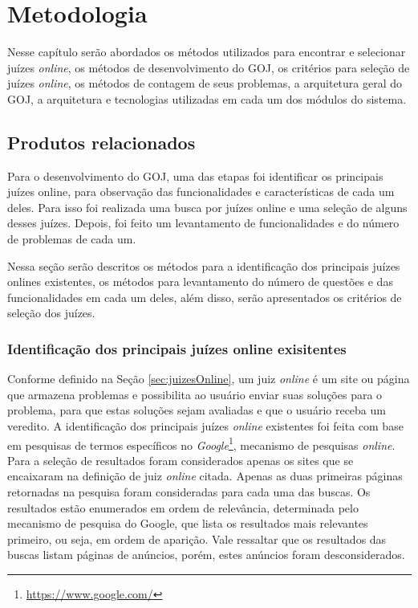 \chapter{Metodologia}
\label{cap:metodologia}

Nesse capítulo serão abordados os métodos utilizados para encontrar e selecionar juízes \textit{online}, os métodos de desenvolvimento do GOJ, os critérios para seleção de juízes \textit{online}, os métodos de contagem de seus problemas, a arquitetura geral do GOJ, a arquitetura e tecnologias utilizadas em cada um dos módulos do sistema.

\section{Produtos relacionados}

Para o desenvolvimento do GOJ, uma das etapas foi identificar os principais juízes online, para observação das funcionalidades e características de cada um deles. Para isso foi realizada uma busca por juízes online e uma seleção de alguns desses juízes. Depois, foi feito um levantamento de funcionalidades e do número de problemas de cada um.

Nessa seção serão descritos os métodos para a identificação dos principais juízes onlines existentes, os métodos para levantamento do número de questões e das funcionalidades em cada um deles, além disso, serão apresentados os critérios de seleção dos juízes.

\subsection{Identificação dos principais juízes online exisitentes}
\label{subsec:selecao_juizes}

Conforme definido na Seção \ref{sec:juizesOnline}, um juiz \textit{online} é um site ou página que armazena problemas e possibilita ao usuário enviar suas soluções para o problema, para que estas soluções sejam avaliadas e que o usuário receba um veredito. A identificação dos principais juízes \textit{online} existentes foi feita com base em pesquisas de termos específicos no \textit{Google}\footnote{\url{https://www.google.com/}}, mecanismo de pesquisas \textit{online}. Para a seleção de resultados foram considerados apenas os sites que se encaixaram na definição de juiz \textit{online} citada. Apenas as duas primeiras páginas retornadas na pesquisa foram consideradas para cada uma das buscas. Os resultados estão enumerados em ordem de relevância, determinada pelo mecanismo de pesquisa do Google, que lista os resultados mais relevantes primeiro, ou seja, em ordem de aparição. Vale ressaltar que os resultados das buscas listam páginas de anúncios, porém, estes anúncios foram desconsiderados.


